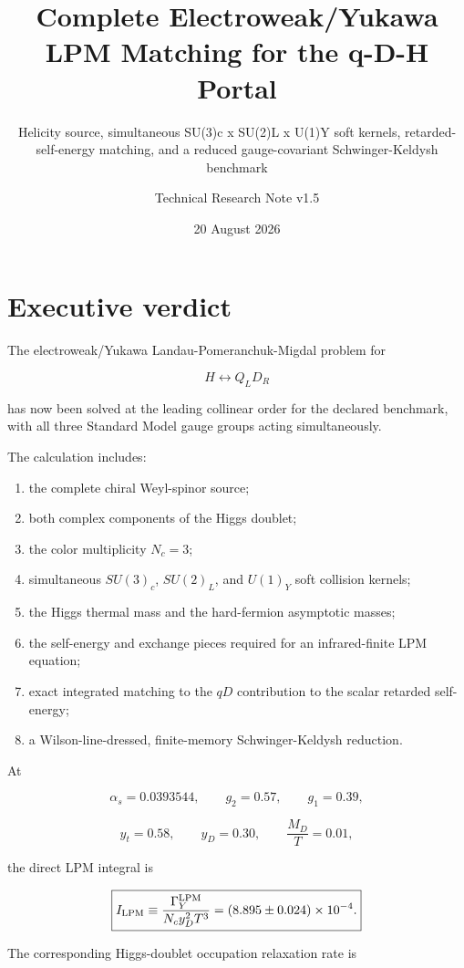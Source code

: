 \documentclass[
  10pt,
]{article}
\title{Complete Electroweak/Yukawa LPM Matching for the q-D-H Portal}
\subtitle{Helicity source, simultaneous SU(3)c x SU(2)L x U(1)Y soft
kernels, retarded-self-energy matching, and a reduced gauge-covariant
Schwinger-Keldysh benchmark}
\author{Technical Research Note v1.5}
\date{20 August 2026}
\providecommand{\tightlist}{%
  \setlength{\itemsep}{0pt}\setlength{\parskip}{0pt}}
\begin{document}
\maketitle

{
\hypersetup{linkcolor=}
\setcounter{tocdepth}{3}
\tableofcontents
}
\section{Executive verdict}\label{executive-verdict}

The electroweak/Yukawa Landau-Pomeranchuk-Migdal problem for

\[
H\leftrightarrow Q_L D_R
\]

has now been solved at the leading collinear order for the declared
benchmark, with all three Standard Model gauge groups acting
simultaneously.

The calculation includes:

\begin{enumerate}
\def\labelenumi{\arabic{enumi}.}
\tightlist
\item
  the complete chiral Weyl-spinor source;
\item
  both complex components of the Higgs doublet;
\item
  the color multiplicity \(N_c=3\);
\item
  simultaneous \(SU(3)_c\), \(SU(2)_L\), and \(U(1)_Y\) soft collision
  kernels;
\item
  the Higgs thermal mass and the hard-fermion asymptotic masses;
\item
  the self-energy and exchange pieces required for an infrared-finite
  LPM equation;
\item
  exact integrated matching to the \(qD\) contribution to the scalar
  retarded self-energy;
\item
  a Wilson-line-dressed, finite-memory Schwinger-Keldysh reduction.
\end{enumerate}

At

\[
\alpha_s=0.0393544,
\qquad
g_2=0.57,
\qquad
g_1=0.39,
\]

\[
y_t=0.58,
\qquad
y_D=0.30,
\qquad
\frac{M_D}{T}=0.01,
\]

the direct LPM integral is

\[
\boxed{
I_{\rm LPM}
\equiv
\frac{\Gamma_Y^{\rm LPM}}
{N_c y_D^2T^3}
=
(8.895\pm0.024)\times10^{-4}.
}
\]

The corresponding Higgs-doublet occupation relaxation rate is
\end{document}
